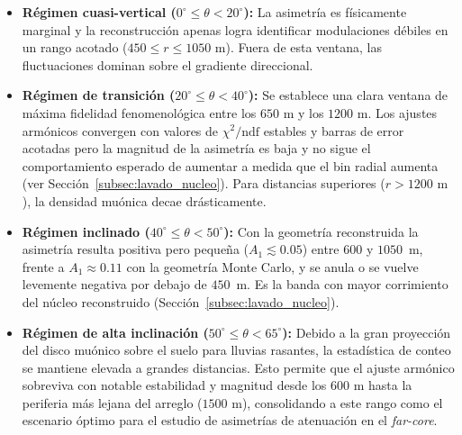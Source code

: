 \begin{itemize}
	\item \textbf{Régimen cuasi-vertical ($0^\circ \le \theta < 20^\circ$):} La asimetría es físicamente marginal y la reconstrucción apenas logra identificar modulaciones débiles en un rango acotado ($450 \le r \le 1050\text{ m}$). Fuera de esta ventana, las fluctuaciones dominan sobre el gradiente direccional.
	
	\item \textbf{Régimen de transición ($20^\circ \le \theta < 40^\circ$):} Se establece una clara ventana de máxima fidelidad fenomenológica entre los $650\text{ m}$ y los $1200\text{ m}$. Los ajustes armónicos convergen con valores de $\chi^2/\mathrm{ndf}$ estables y barras de error acotadas pero la magnitud de la asimetría es baja y no sigue el comportamiento esperado de aumentar a medida que el bin radial aumenta (ver Sección~\ref{subsec:lavado_nucleo}). Para distancias superiores ($r > 1200\text{ m}$), la densidad muónica decae drásticamente.

	\item \textbf{Régimen inclinado ($40^\circ \le \theta < 50^\circ$):} Con la geometría reconstruida la asimetría resulta positiva pero pequeña ($A_1 \lesssim 0.05$) entre $600$ y $1050$~m, frente a $A_1 \approx 0.11$ con la geometría Monte Carlo, y se anula o se vuelve levemente negativa por debajo de $450$~m. Es la banda con mayor corrimiento del núcleo reconstruido (Sección~\ref{subsec:lavado_nucleo}).

	\item \textbf{Régimen de alta inclinación ($50^\circ \le \theta < 65^\circ$):} Debido a la gran proyección del disco muónico sobre el suelo para lluvias rasantes, la estadística de conteo se mantiene elevada a grandes distancias. Esto permite que el ajuste armónico sobreviva con notable estabilidad y magnitud desde los $600\text{ m}$ hasta la periferia más lejana del arreglo ($1500\text{ m}$), consolidando a este rango como el escenario óptimo para el estudio de asimetrías de atenuación en el \textit{far-core}.
\end{itemize}

